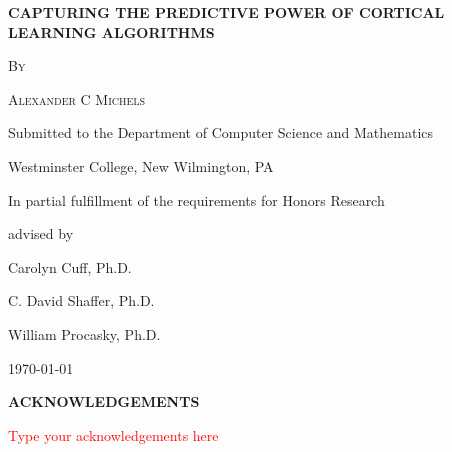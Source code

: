 \documentclass[oneside,12pt,openany]{book}
\renewcommand{\baselinestretch}{1.5}
\begin{document}
	\frontmatter
	\begin{titlepage}
		\centering
		{\scshape\Large \textbf{CAPTURING THE PREDICTIVE POWER OF CORTICAL LEARNING ALGORITHMS} \par}
		\vspace{5.5cm}
		{\scshape\large By \par}
		{\scshape\large Alexander C Michels\par}
		\vfill
		{\large Submitted to the Department of Computer Science and Mathematics\par}
		{\large Westminster College, New Wilmington, PA\par}
		{\large In partial fulfillment of the requirements for Honors Research\par}

		\vfill
		advised by\par
		\large
		Carolyn Cuff, Ph.D.\par
		C. David Shaffer, Ph.D.\par
		William Procasky, Ph.D.\par
		
		\vfill
		
		{\large \today\par}
	\end{titlepage}
	\renewcommand{\baselinestretch}{.7}
	\setcounter{tocdepth}{0}
	\tableofcontents
	\vfill
	\pagebreak
	
	\renewcommand{\baselinestretch}{1.5}
	
	\begin{center}
		\textbf{ACKNOWLEDGEMENTS}
	\end{center}

	\textcolor{red}{Type your acknowledgements here}
	\vfill
	\pagebreak
	
\end{document}
